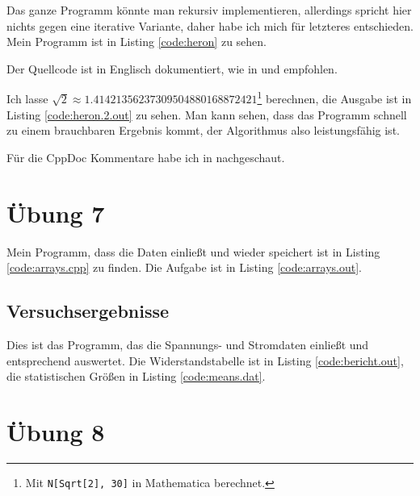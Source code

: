 Das ganze Programm könnte man rekursiv implementieren, allerdings spricht hier nichts gegen eine iterative Variante, daher habe ich mich für letzteres entschieden. Mein Programm ist in Listing \ref{code:heron} zu sehen.

Der Quellcode ist in Englisch dokumentiert, wie in \cite{complete} und \cite{rapid} empfohlen.


Ich lasse $\sqrt{2} \approx 1.41421356237309504880168872421$\footnote{Mit \texttt{N[Sqrt[2], 30]} in Mathematica berechnet.} berechnen, die Ausgabe ist in Listing \ref{code:heron.2.out} zu sehen. Man kann sehen, dass das Programm schnell zu einem brauchbaren Ergebnis kommt, der Algorithmus also leistungsfähig ist.


Für die CppDoc Kommentare habe ich in \cite{cppdoc} nachgeschaut.

\chapter{Übung 7}

Mein Programm, dass die Daten einließt und wieder speichert ist in Listing \ref{code:arrays.cpp} zu finden. Die Aufgabe ist in Listing \ref{code:arrays.out}.


\section{Versuchsergebnisse}

Dies ist das Programm, das die Spannungs- und Stromdaten einließt und entsprechend auswertet. Die Widerstandstabelle ist in Listing \ref{code:bericht.out}, die statistischen Größen in Listing \ref{code:means.dat}.


\chapter{Übung 8}

